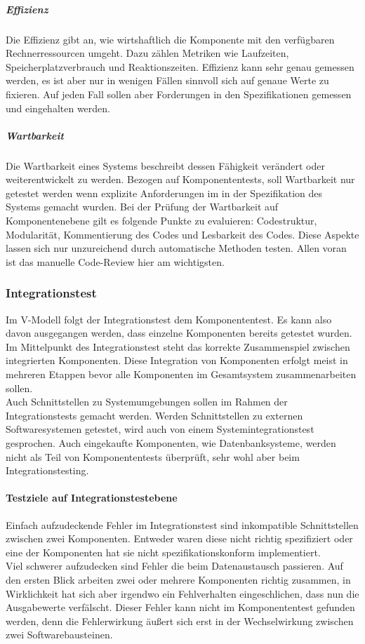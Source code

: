 \subparagraph{Effizienz} Die Effizienz gibt an, wie wirtshaftlich die Komponente mit den verfügbaren Rechnerressourcen umgeht\cite{spillner_basiswissen_2012}. Dazu zählen Metriken wie Laufzeiten, Speicherplatzverbrauch und Reaktionszeiten. Effizienz kann sehr genau gemessen werden, es ist aber nur in wenigen Fällen sinnvoll sich auf genaue Werte zu fixieren. Auf jeden Fall sollen aber Forderungen in den Spezifikationen gemessen und eingehalten werden.

\subparagraph{Wartbarkeit}
Die Wartbarkeit eines Systems beschreibt dessen Fähigkeit verändert oder weiterentwickelt zu werden. Bezogen auf Komponententests, soll Wartbarkeit nur getestet werden wenn explizite Anforderungen im in der Spezifikation des Systems gemacht wurden. Bei der Prüfung der Wartbarkeit auf Komponentenebene gilt es folgende Punkte zu evaluieren: Codestruktur, Modularität, Kommentierung des Codes und Lesbarkeit des Codes. Diese Aspekte lassen sich nur unzureichend durch automatische Methoden testen. Allen voran ist das manuelle Code-Review hier am wichtigsten.\cite{spillner_basiswissen_2012}

\subsubsection{Integrationstest}
Im V-Modell folgt der Integrationstest dem Komponententest. Es kann also davon ausgegangen werden, dass einzelne Komponenten bereits getestet wurden. Im Mittelpunkt des Integrationstest steht das korrekte Zusammenspiel zwischen integrierten Komponenten. Diese Integration von Komponenten erfolgt meist in mehreren Etappen bevor alle Komponenten im Gesamtsystem zusammenarbeiten sollen.\\
Auch Schnittstellen zu Systemumgebungen sollen im Rahmen der Integrationstests gemacht werden. Werden Schnittstellen zu externen Softwaresystemen getestet, wird auch von einem Systemintegrationstest gesprochen\cite{spillner_basiswissen_2012}. Auch eingekaufte Komponenten, wie Datenbanksysteme, werden nicht als Teil von Komponententests überprüft, sehr wohl aber beim Integrationstesting.

\paragraph{Testziele auf Integrationstestebene}
Einfach aufzudeckende Fehler im Integrationstest sind inkompatible Schnittstellen zwischen zwei Komponenten. Entweder waren diese nicht richtig spezifiziert oder eine der Komponenten hat sie nicht spezifikationskonform implementiert.\\
Viel schwerer aufzudecken sind Fehler die beim Datenaustausch passieren. Auf den ersten Blick arbeiten zwei oder mehrere Komponenten richtig zusammen, in Wirklichkeit hat sich aber irgendwo ein Fehlverhalten eingeschlichen, dass nun die Ausgabewerte verfälscht. Dieser Fehler kann nicht im Komponententest gefunden werden, denn die Fehlerwirkung äußert sich erst in der Wechselwirkung zwischen zwei Softwarebausteinen\cite{spillner_basiswissen_2012}.


